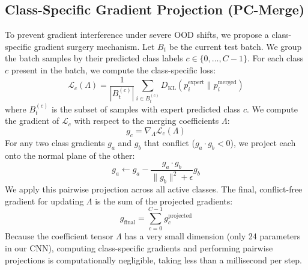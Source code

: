 \documentclass{article}
\theoremstyle{plain}
\theoremstyle{definition}
\theoremstyle{remark}
\begin{document}
\subsection{Class-Specific Gradient Projection (PC-Merge)}
To prevent gradient interference under severe OOD shifts, we propose a class-specific gradient surgery mechanism. Let $B_t$ be the current test batch. We group the batch samples by their predicted class labels $c \in \{0, \dots, C-1\}$. For each class $c$ present in the batch, we compute the class-specific loss:
\begin{equation}
\mathcal{L}_c(\Lambda) = \frac{1}{|B_t^{(c)}|} \sum_{i \in B_t^{(c)}} D_{\text{KL}}(p^{\text{expert}}_{i} \parallel p^{\text{merged}}_{i})
\end{equation}
where $B_t^{(c)}$ is the subset of samples with expert predicted class $c$. We compute the gradient of $\mathcal{L}_c$ with respect to the merging coefficients $\Lambda$:
\begin{equation}
g_c = \nabla_{\Lambda} \mathcal{L}_c(\Lambda)
\end{equation}
For any two class gradients $g_a$ and $g_b$ that conflict ($g_a \cdot g_b < 0$), we project each onto the normal plane of the other:
\begin{equation}
g_a \leftarrow g_a - \frac{g_a \cdot g_b}{\|g_b\|^2 + \epsilon} g_b
\end{equation}
We apply this pairwise projection across all active classes. The final, conflict-free gradient for updating $\Lambda$ is the sum of the projected gradients:
\begin{equation}
g_{\text{final}} = \sum_{c=0}^{C-1} g_c^{\text{projected}}
\end{equation}
Because the coefficient tensor $\Lambda$ has a very small dimension (only 24 parameters in our CNN), computing class-specific gradients and performing pairwise projections is computationally negligible, taking less than a millisecond per step.
\end{document}
